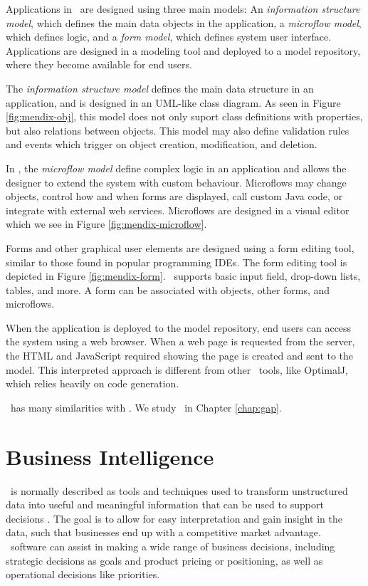 Applications in \mendix~are designed using three main models: An \textit{information structure model}, which defines the main data objects in the application, a \textit{microflow model}, which defines logic, and a \textit{form model}, which defines system user interface. Applications are designed in a modeling tool and deployed to a model repository, where they become available for end users.

The \textit{information structure model} defines the main data structure in an application, and is designed in an UML-like class diagram. As seen in Figure \ref{fig:mendix-obj}, this model does not only suport class definitions with properties, but also relations between objects. This model may also define validation rules and events which trigger on object creation, modification, and deletion.

In \mendix, the \textit{microflow model} define complex logic in an application and allows the designer to extend the system with custom behaviour. Microflows may change objects, control how and when forms are displayed, call custom Java code, or integrate with external web services. Microflows are designed in a visual editor which we see in Figure \ref{fig:mendix-microflow}.


Forms and other graphical user elements are designed using a form editing tool, similar to those found in popular programming IDEs. The form editing tool is depicted in Figure \ref{fig:mendix-form}. \mendix~supports basic input field, drop-down lists, tables, and more. A form can be associated with objects, other forms, and microflows. 

When the application is deployed to the model repository, end users can access the system using a web browser. When a web page is requested from the server, the HTML and JavaScript required showing the page is created and sent to the model. This interpreted approach is different from other \mde~tools, like OptimalJ, which relies heavily on code generation.

\gap~has many similarities with \mendix. We study \gap~in Chapter \ref{chap:gap}.

\section{Business Intelligence}
\label{sec:Business Intelligence}
\bi~is normally described as tools and techniques used to transform unstructured data into useful and meaningful information that can be used to support decisions \cite{Wikipedia_contributors2015-ag}. The goal is to allow for easy interpretation and gain insight in the data, such that businesses end up with a competitive market advantage. \bi~software can assist in making a wide range of business decisions, including strategic decisions as goals and product pricing or positioning, as well as operational decisions like priorities.

